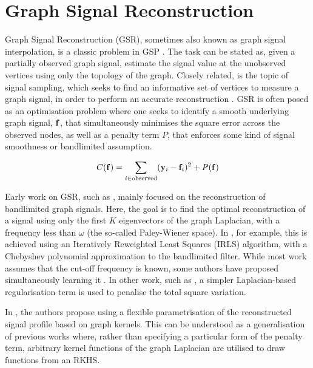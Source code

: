 \section{Graph Signal Reconstruction}

\label{sec:GSR_review}

Graph Signal Reconstruction (GSR), sometimes also known as graph signal interpolation, is a classic problem in GSP \citep{Ortega2018}. The task can be stated as, given a partially observed graph signal, estimate the signal value at the unobserved vertices using only the topology of the graph. Closely related, is the topic of signal sampling, which seeks to find an informative set of vertices to measure a graph signal, in order to perform an accurate reconstruction \citep{Tanaka2020}. GSR is often posed as an optimisation problem where one seeks to identify a smooth underlying graph signal, $\mathbf{f}$, that simultaneously minimises the square error across the observed nodes, as well as a penalty term $P$, that enforces some kind of signal smoothness or bandlimited assumption. 

\begin{equation}
    C(\mathbf{f}) = \sum_{i \in \text{observed}} (\mathbf{y}_i - \mathbf{f}_i)^2 + P(\mathbf{f})
\end{equation}

Early work on GSR, such as \cite{Narang2013, Wang2015b, Anis2016}, mainly focused on the reconstruction of bandlimited graph signals. Here, the goal is to find the optimal reconstruction of a signal using only the first $K$ eigenvectors of the graph Laplacian, with a frequency less than $\omega$ (the so-called Paley-Wiener space). In \cite{Narang2013}, for example, this is achieved using an Iteratively Reweighted Least Squares (IRLS) algorithm, with a Chebyshev polynomial approximation to the bandlimited filter. While most work assumes that the cut-off frequency is known, some authors have proposed simultaneously learning it \citep{Varma2015, Marques2016}. In other work, such as \citep{Belkin2004b, Narang2013c, Chen2015}, a simpler Laplacian-based regularisation term is used to penalise the total square variation.

In \cite{Romero2017b}, the authors propose using a flexible parametrisation of the reconstructed signal profile based on graph kernels. This can be understood as a generalisation of previous works where, rather than specifying a particular form of the penalty term, arbitrary kernel functions of the graph Laplacian are utilised to draw functions from an RKHS.

